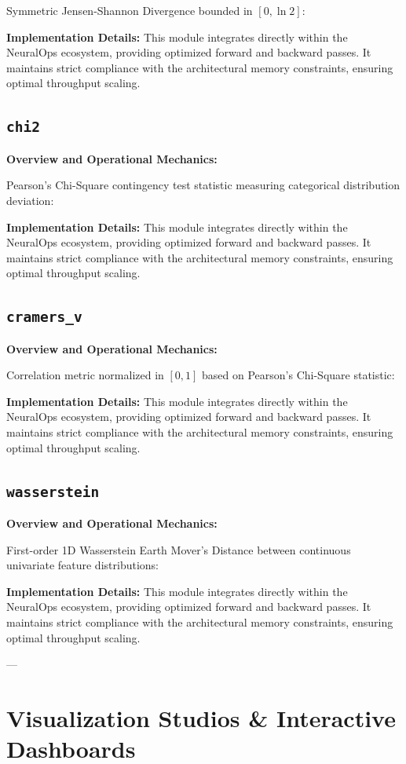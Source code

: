 \documentclass[10pt,twocolumn,letterpaper]{article}
\begin{document}
Symmetric Jensen-Shannon Divergence bounded in $[0, \ln 2]$:

\textbf{Implementation Details:}
This module integrates directly within the NeuralOps ecosystem, providing optimized forward and backward passes. It maintains strict compliance with the architectural memory constraints, ensuring optimal throughput scaling.

\subsection{\texttt{chi2}}
\textbf{Overview and Operational Mechanics:}

Pearson's Chi-Square contingency test statistic measuring categorical distribution deviation:

\textbf{Implementation Details:}
This module integrates directly within the NeuralOps ecosystem, providing optimized forward and backward passes. It maintains strict compliance with the architectural memory constraints, ensuring optimal throughput scaling.

\subsection{\texttt{cramers\_v}}
\textbf{Overview and Operational Mechanics:}

Correlation metric normalized in $[0, 1]$ based on Pearson's Chi-Square statistic:

\textbf{Implementation Details:}
This module integrates directly within the NeuralOps ecosystem, providing optimized forward and backward passes. It maintains strict compliance with the architectural memory constraints, ensuring optimal throughput scaling.

\subsection{\texttt{wasserstein}}
\textbf{Overview and Operational Mechanics:}

First-order 1D Wasserstein Earth Mover's Distance between continuous univariate feature distributions:

\textbf{Implementation Details:}
This module integrates directly within the NeuralOps ecosystem, providing optimized forward and backward passes. It maintains strict compliance with the architectural memory constraints, ensuring optimal throughput scaling.


---

\section{Visualization Studios \& Interactive Dashboards}
\label{app:vis_details}
\end{document}
